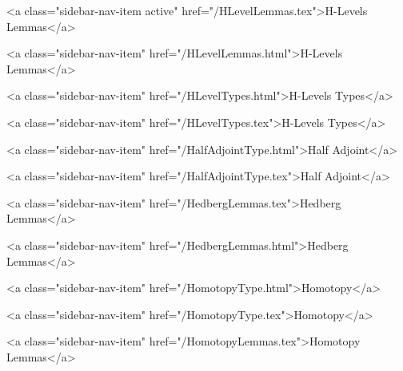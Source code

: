       
        
          <a class="sidebar-nav-item active" href="/HLevelLemmas.tex">H-Levels Lemmas</a>
        
      
    
      
        
          <a class="sidebar-nav-item" href="/HLevelLemmas.html">H-Levels Lemmas</a>
        
      
    
      
        
          <a class="sidebar-nav-item" href="/HLevelTypes.html">H-Levels Types</a>
        
      
    
      
        
          <a class="sidebar-nav-item" href="/HLevelTypes.tex">H-Levels Types</a>
        
      
    
      
        
          <a class="sidebar-nav-item" href="/HalfAdjointType.html">Half Adjoint</a>
        
      
    
      
        
          <a class="sidebar-nav-item" href="/HalfAdjointType.tex">Half Adjoint</a>
        
      
    
      
        
          <a class="sidebar-nav-item" href="/HedbergLemmas.tex">Hedberg Lemmas</a>
        
      
    
      
        
          <a class="sidebar-nav-item" href="/HedbergLemmas.html">Hedberg Lemmas</a>
        
      
    
      
        
          <a class="sidebar-nav-item" href="/HomotopyType.html">Homotopy</a>
        
      
    
      
        
          <a class="sidebar-nav-item" href="/HomotopyType.tex">Homotopy</a>
        
      
    
      
        
          <a class="sidebar-nav-item" href="/HomotopyLemmas.tex">Homotopy Lemmas</a>
        
      
    
